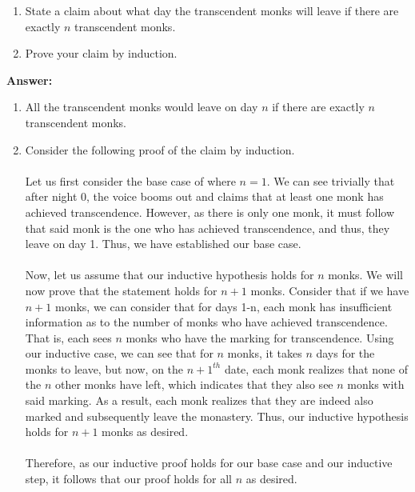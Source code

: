 \documentclass[12pt]{article}
\begin{document}
\begin{enumerate}
	\item State a claim about what day the transcendent monks will leave if there are exactly $n$ transcendent monks.
	\item Prove your claim by induction. 
\end{enumerate}

\bf{Answer:}
\begin{enumerate}
	\item All the transcendent monks would leave on day $n$ if there are exactly $n$ transcendent monks.
	\item Consider the following proof of the claim by induction. \\\\
	Let us first consider the base case of where $n = 1$. We can see trivially that after night 0, the voice booms out and claims that at least one monk has achieved transcendence. However, as there is only one monk, it must follow that said monk is the one who has achieved transcendence, and thus, they leave on day 1. Thus, we have established our base case. \\\\
	Now, let us assume that our inductive hypothesis holds for $n$ monks. We will now prove that the statement holds for $n + 1$ monks. Consider that if we have $n+1$ monks, we can consider that for days 1-n, each monk has insufficient information as to the number of monks who have achieved transcendence. That is, each sees $n$ monks who have the marking for transcendence.
	Using our inductive case, we can see that for $n$ monks, it takes $n$ days for the monks to leave, but now, on the ${n+1}^{th}$ date, each monk realizes that none of the $n$ other monks have left, which indicates that they also see $n$ monks with said marking.
	As a result, each monk realizes that they are indeed also marked and subsequently leave the monastery. Thus, our inductive hypothesis holds for $n+1$ monks as desired.\\\\
	Therefore, as our inductive proof holds for our base case and our inductive step, it follows that our proof holds for all $n$ as desired.
	
\end{enumerate}
\end{document}
